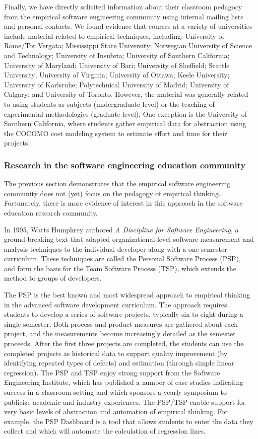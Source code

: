 Finally, we have directly solicited information about their classroom
pedagocy from the empirical software engineering community using internal
mailing lists and personal contacts. We found evidence that courses at a
variety of universities include material related to empirical techniques,
including: University of Rome/Tor Vergata; Mississippi State University;
Norwegian University of Science and Technology; University of Insubria;
University of Southern California; University of Maryland; University of
Bari; University of Sheffield; Seattle University; University of Virginia;
University of Ottawa; Keele University; University of Karlsruhe;
Polytechnical University of Madrid; University of Calgary; and University
of Toronto.  However, the material was generally related to using students
as subjects (undergraduate level) or the teaching of experimental
methodologies (graduate level).  One exception is the University of
Southern California, where students gather empirical data for abstraction
using the COCOMO cost modeling system to estimate effort and time for their
projects.

\subsubsection{Research in the software engineering education community}

The previous section demonstrates that the empirical software engineering
community does not (yet) focus on the pedagogy of empirical thinking. Fortunately, 
there is more evidence of interest in this approach in the software education 
research community.

In 1995, Watts Humphrey authored {\em A Discipline for Software
Engineering}, a ground-breaking text that adapted organizational-level
software measurement and analysis techniques to the individual developer
along with a one semester curriculum. These techniques are called the
Personal Software Process (PSP), and form the basis for the Team Software
Process (TSP), which extends the method to groups of developers. 

The PSP is the best known and most widespread approach to empirical
thinking in the advanced software development curriculum.  The approach
requires students to develop a series of software projects, typically six
to eight during a single semester.  Both process and product measures are
gathered about each project, and the measurements become increasingly
detailed as the semester proceeds. After the first three projects are
completed, the students can use the completed projects as historical data
to support quality improvement (by identifying repeated types of defects)
and estimation (through simple linear regression).  The PSP and TSP enjoy
strong support from the Software Engineering Institute, which has published
a number of case studies indicating success in a classroom setting and
which sponsors a yearly symposium to publicize academic and industry
experiences.  The PSP/TSP enable support for very basic levels of
abstraction and automation of empirical thinking. For example, the PSP
Dashboard is a tool that allows students to enter the data they collect and
which will automate the calculation of regression lines.

